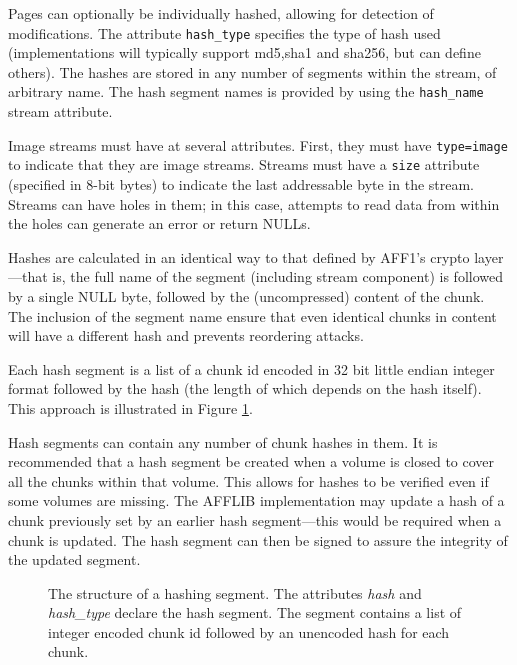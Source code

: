 \documentclass[10pt, conference]{IEEEtran}
\begin{document}
Pages can optionally be individually hashed, allowing for detection
of modifications. The attribute \texttt{hash\_type} specifies the type of
hash used (implementations will typically support md5,sha1 and sha256, but can
define others). The hashes are stored in any number of segments within
the stream, of arbitrary name. The hash segment names is provided by
using the \texttt{hash\_name} stream attribute.

Image streams must have at several attributes. First, they must have
\texttt{type=image} to indicate that they are image streams. Streams
must have a \texttt{size} attribute (specified in 8-bit bytes) to
indicate the last addressable byte in the stream. Streams can have
holes in them; in this case, attempts to read data from within the
holes can generate an error or return NULLs.

Hashes are calculated in an identical way to that defined by AFF1's
crypto layer\cite{garfinkel:affcrypto}---that is, the full name of the
segment (including stream component) is followed by a single NULL
byte, followed by the (uncompressed) content of the chunk. The
inclusion of the segment name ensure that even identical chunks in
content will have a different hash and prevents reordering attacks.

Each hash segment is a list of a chunk id encoded in 32 bit
little endian integer format followed by the hash (the length of which
depends on the hash itself). This approach is illustrated in Figure
\ref{hash_index}. 

Hash segments can contain any number of chunk hashes in them. It is
recommended that a hash segment be created when a volume is closed to
cover all the chunks within that volume. This allows for hashes to be
verified even if some volumes are missing. The AFFLIB implementation
may update a hash of a chunk previously set by an earlier hash
segment---this would be required when a chunk is updated. The hash
segment can then be signed to assure the integrity of the updated segment.

\begin{figure}[tb]
  \begin{center}
  \mbox{\columnwidth {}}
  \caption{The structure of a hashing segment. The attributes {\em
  hash} and {\em hash\_type} declare the hash segment. The segment
  contains a list of integer encoded chunk id followed by an unencoded
  hash for each chunk.}
  \label{hash_index}
  \end{center}
\end{figure}
\end{document}
